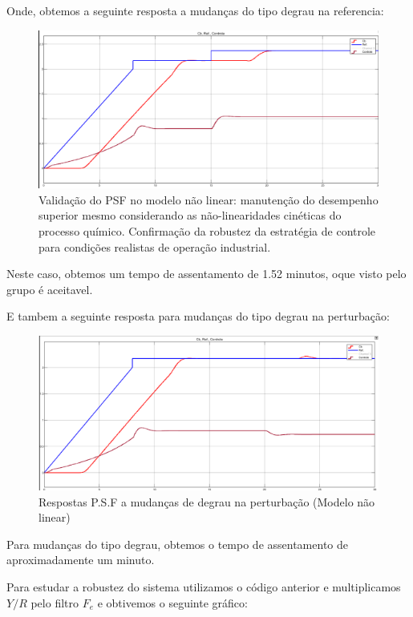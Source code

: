 \documentclass[a4paper,12pt]{article}
\begin{document}
Onde, obtemos a seguinte resposta a mudanças do tipo degrau na referencia:

\begin{figure} [H]
    \centering
    \includegraphics[width=0.9\linewidth]{image7.png}
    \caption{Validação do PSF no modelo não linear: manutenção do desempenho superior mesmo considerando as não-linearidades cinéticas do processo químico. Confirmação da robustez da estratégia de controle para condições realistas de operação industrial.}
    \label{fig:psf_nonlinear_ref_response}
\end{figure}

Neste caso, obtemos um tempo de assentamento de 1.52 minutos, oque visto pelo grupo é aceitavel.

E tambem a seguinte resposta para mudanças do tipo degrau na perturbação:

\begin{figure} [H]
    \centering
    \includegraphics[width=0.9\linewidth]{image8.png}
    \caption{Respostas P.S.F a mudanças de degrau na perturbação (Modelo não linear)}
    \label{fig:psf_nonlinear_disturbance_response}
\end{figure}

Para mudanças do tipo degrau, obtemos o tempo de assentamento de
aproximadamente um minuto.


Para estudar a robustez do sistema utilizamos o código anterior e multiplicamos $Y/R$ pelo filtro $F_e$ e obtivemos o seguinte gráfico:
\end{document}
